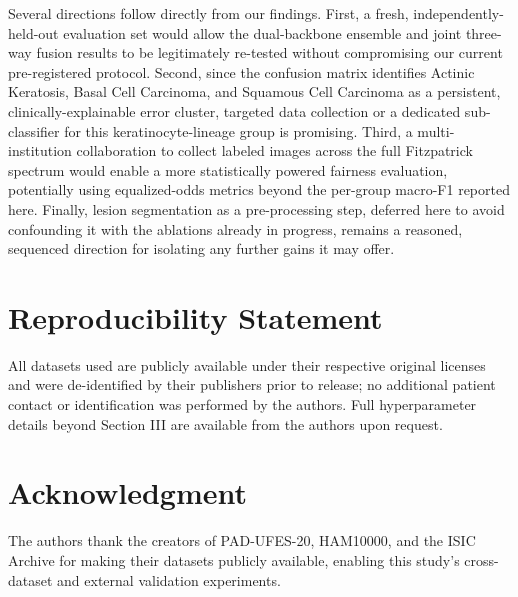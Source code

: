 \documentclass[conference]{IEEEtran}
\begin{document}
Several directions follow directly from our findings. First, a fresh, independently-held-out evaluation set would allow the dual-backbone ensemble and joint three-way fusion results to be legitimately re-tested without compromising our current pre-registered protocol. Second, since the confusion matrix identifies Actinic Keratosis, Basal Cell Carcinoma, and Squamous Cell Carcinoma as a persistent, clinically-explainable error cluster, targeted data collection or a dedicated sub-classifier for this keratinocyte-lineage group is promising. Third, a multi-institution collaboration to collect labeled images across the full Fitzpatrick spectrum would enable a more statistically powered fairness evaluation, potentially using equalized-odds metrics beyond the per-group macro-F1 reported here. Finally, lesion segmentation as a pre-processing step, deferred here to avoid confounding it with the ablations already in progress, remains a reasoned, sequenced direction for isolating any further gains it may offer.

\section*{Reproducibility Statement}
All datasets used are publicly available under their respective original licenses and were de-identified by their publishers prior to release; no additional patient contact or identification was performed by the authors. Full hyperparameter details beyond Section III are available from the authors upon request.

\section*{Acknowledgment}
The authors thank the creators of PAD-UFES-20, HAM10000, and the ISIC Archive for making their datasets publicly available, enabling this study's cross-dataset and external validation experiments.
\end{document}
